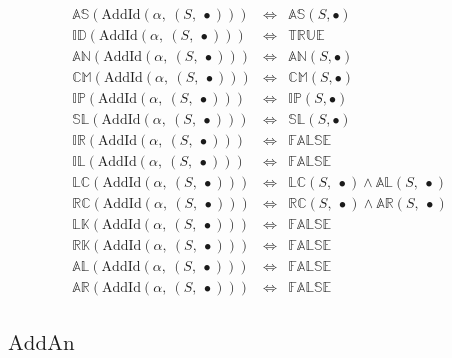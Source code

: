 \documentclass[10pt]{article}
\newcommand{\propname}[1]{{\mathbb{#1}}}
\begin{document}
\[
\begin{array}{rcl} 
\propname{AS}(\mathrm{AddId}(\alpha,\ (S,\ \bullet))) 
  & \Leftrightarrow %
  & \propname{AS}(S, \bullet) \\
\propname{ID}(\mathrm{AddId}(\alpha,\ (S,\ \bullet))) 
  & \Leftrightarrow %
  & \propname{TRUE} \\ 
\propname{AN}(\mathrm{AddId}(\alpha,\ (S,\ \bullet))) 
  & \Leftrightarrow %
  & \propname{AN}(S, \bullet) \\
\propname{CM}(\mathrm{AddId}(\alpha,\ (S,\ \bullet))) 
  & \Leftrightarrow %
  & \propname{CM}(S, \bullet) \\
\propname{IP}(\mathrm{AddId}(\alpha,\ (S,\ \bullet))) 
  & \Leftrightarrow %
  & \propname{IP}(S, \bullet) \\
\propname{SL}(\mathrm{AddId}(\alpha,\ (S,\ \bullet))) 
  & \Leftrightarrow %
  & \propname{SL}(S, \bullet) \\
\propname{IR}(\mathrm{AddId}(\alpha,\ (S,\ \bullet))) 
  & \Leftrightarrow %
  & \propname{FALSE}\\ 
\propname{IL}(\mathrm{AddId}(\alpha,\ (S,\ \bullet))) 
  & \Leftrightarrow %
  & \propname{FALSE}\\ 
\propname{LC}(\mathrm{AddId}(\alpha,\ (S,\ \bullet))) 
  & \Leftrightarrow %
  & \propname{LC}(S,\ \bullet) \wedge \propname{AL}(S,\ \bullet) \\
\propname{RC}(\mathrm{AddId}(\alpha,\ (S,\ \bullet))) 
  & \Leftrightarrow %
  & \propname{RC}(S,\ \bullet) \wedge \propname{AR}(S,\ \bullet) \\
\propname{LK}(\mathrm{AddId}(\alpha,\ (S,\ \bullet))) 
  & \Leftrightarrow %
  & \propname{FALSE}\\ 
\propname{RK}(\mathrm{AddId}(\alpha,\ (S,\ \bullet))) 
  & \Leftrightarrow %
  & \propname{FALSE}\\ 
\propname{AL}(\mathrm{AddId}(\alpha,\ (S,\ \bullet))) 
  & \Leftrightarrow %
  & \propname{FALSE}\\ 
\propname{AR}(\mathrm{AddId}(\alpha,\ (S,\ \bullet))) 
  & \Leftrightarrow %
  & \propname{FALSE}\\ 
\end{array} 
\] 

\subsection{$\mathrm{AddAn}$} 
\end{document}
